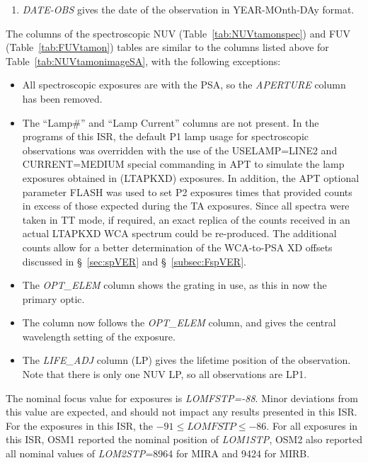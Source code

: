 \begin{enumerate}
As shown in Table~\ref{tab:ApMXDispPosition} the nominal PSA \& WCA \textit{APERYPOS} position for LP2, LP3, and LP4 are +53, +181, and +234, respectively.\footnote{As explained in the TA enabling ISRs for each FUV LP, due
to known behavior of the COS aperture mechanism to miss by one step in \textit{APERYPOS}, entries in the \textsc{pcmech\_ApMXDispPosition} FSW table were intentionally offset by $\pm$ on step, depending on travel direction from NUV/FUV LP1, which
shared the common \textsc{pcmech\_ApMXDispPosition} (\textit{APERYPOS}) entry of +126.}
\item \textit{DATE-OBS} gives the date of the observation in YEAR-MOnth-DAy format.
\end{enumerate}
\normalsize

The columns of the spectroscopic NUV (Table~\ref{tab:NUVtamonspec}) and FUV (Table~\ref{tab:FUVtamon})
tables are similar to the columns listed above for Table~\ref{tab:NUVtamonimageSA}, with the following exceptions:
\begin{itemize}
\item All spectroscopic exposures are with the PSA, so the \textit{APERTURE} column has been removed.
\item The ``Lamp\#''  and ``Lamp Current'' columns are not present. In the programs of this ISR,
the default P1 lamp usage for spectroscopic observations was overridden with the use of the \textsc{USELAMP=LINE2} and \textsc{CURRENT=MEDIUM} special commanding
in APT to simulate the lamp exposures obtained in \numposone {} (\textsc{LTAPKXD}) exposures.
In addition, the APT optional parameter \textsc{FLASH} was used to set P2 exposures times that
provided counts in excess of those expected during the TA exposures.  Since all spectra were taken in TT mode,
if required, an exact replica of the counts received in an actual \textsc{LTAPKXD} WCA spectrum could be re-produced.
The additional counts allow for a better determination of the WCA-to-PSA XD offsets discussed in \S~\ref{sec:spVER} and \S~\ref{subsec:FspVER}.
\item The \textit{OPT\_ELEM} column shows the grating in use, as this in now the primary optic.
\item The column \cenwave now follows the \textit{OPT\_ELEM} column, and gives the central wavelength setting of the exposure.
\item The \textit{LIFE\_ADJ} column (LP) gives the lifetime position of the observation. Note that there is only one NUV LP, so all observations are LP1.
\end{itemize}
\normalsize

The nominal focus value for  exposures is \textit{LOMFSTP=-88}. Minor deviations from this value are expected, and should not impact any results presented in this ISR.
For the exposures in this ISR, the $-91 \leq \textit{LOMFSTP} \leq -86 $. For all exposures in this ISR, OSM1 reported the nominal  position of \textit{LOM1STP}, OSM2
also reported all nominal values of \textit{LOM2STP}=8964 for MIRA and  9424 for MIRB.



